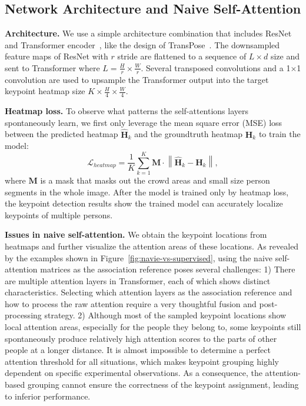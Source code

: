 \documentclass{article} \usepackage{iclr_conference,times}
\begin{document}
\subsection{Network Architecture and Naive Self-Attention}

{\bf Architecture.} We use a simple architecture combination that includes ResNet~\citep{resnet:he2016deep} and Transformer encoder~\citep{vaswani2017attention}, like the design of TransPose~\citep{transpose:yang2021transpose}. 
The downsampled feature maps of ResNet with $r$ stride are flattened to a sequence of $L\times d$ size and sent to Transformer where $L=\frac{H}{r}\times\frac{W}{r}$. Several transposed convolutions and a 1$\times$1 convolution are used to upsample the Transformer output into the target keypoint heatmap size $K\times \frac{H}{4}\times \frac{W}{4}$.

{\bf Heatmap loss.} To observe what patterns the self-attentions layers spontaneously learn, we first only leverage the mean square error (MSE) loss between the predicted heatmap $
\mathbf{\hat{H}}_k$ and the groundtruth heatmap $\mathbf{H}_k$ to train the model:
\begin{equation}
    \mathcal{L}_{heatmap}=\frac{1}{K}\sum_{k=1}^{K}\mathbf{M} \cdot\left\| \mathbf{\hat{H}}_k-\mathbf{H}_k\right\|,
\end{equation}
where $\mathbf{M}$ is a mask that masks out the crowd areas and small size person segments in the whole image. After the model is trained only by heatmap loss, the keypoint detection results show the trained model can accurately localize keypoints of multiple persons. 

{\bf Issues in naive self-attention.} We obtain the keypoint locations from heatmaps and further visualize the attention areas of these locations. 
As revealed by the examples shown in Figure~\ref{fig:navie-vs-supervised}, using the naive self-attention matrices as the association reference poses several challenges: 1) There are multiple attention layers in Transformer, each of which shows distinct characteristics. Selecting which attention layers as the association reference and how to process the raw attention require a very thoughtful fusion and post-processing strategy. 
2) Although most of the sampled keypoint locations show local attention areas, especially for the people they belong to, some keypoints still spontaneously produce relatively high attention scores to the parts of other people at a longer distance. It is almost impossible to determine a perfect attention threshold for all situations, which makes keypoint grouping highly dependent on specific experimental observations. As a consequence, the attention-based grouping cannot ensure the correctness of the keypoint assignment, leading to inferior performance. 
\end{document}
